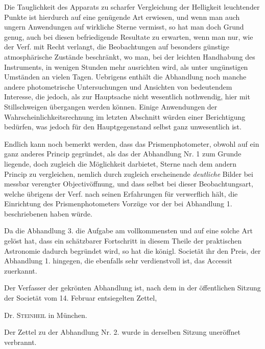 Die Tauglichkeit des Apparats zu scharfer Vergleichung der Helligkeit leuchtender Punkte ist
hierdurch auf eine genügende Art erwiesen, und wenn man auch ungern Anwendungen auf wirkliche
Sterne vermisst, so hat man doch Grund genug, auch bei diesen befriedigende Resultate zu erwarten,
wenn man nur, wie der Verf. mit Recht verlangt, die Beobachtungen auf besonders günstige
atmosphärische Zustände beschränkt, wo man, bei der leichten Handhabung des Instruments, in
wenigen Stunden mehr ausrichten wird, als unter ungünstigen Umständen an vielen Tagen. Uebrigens
enthält die Abhandlung noch manche andere photometrische Untersuchungen und Ansichten von
bedeutendem Interesse, die jedoch, als zur Hauptsache nicht wesentlich nothwendig, hier mit
Stillschweigen übergangen werden können. Einige Anwendungen der Wahrscheinlichkeitsrechnung im
letzten Abschnitt würden einer Berichtigung bedürfen, was jedoch für den Hauptgegenstand selbst
ganz unwesentlich ist.

Endlich kann noch bemerkt werden, dass das Prismenphotometer, obwohl auf ein ganz anderes
Princip gegründet, als das der Abhandlung Nr. 1 zum Grunde liegende, doch zugleich die
Möglichkeit darbietet, Sterne nach dem andern Princip zu vergleichen, nemlich durch zugleich
erscheinende \emph{deutliche} Bilder bei messbar verengter Objectivöffnung, und dass selbst bei
dieser Beobachtungsart, welche übrigens der Verf. nach seinen Erfahrungen für verwerflich hält,
die Einrichtung des Prismenphotometers Vorzüge vor der bei Abhandlung 1. beschriebenen haben
würde.

Da die Abhandlung 3. die Aufgabe am vollkommensten und auf eine solche Art gelöst hat, dass ein
schätzbarer Fortschritt in diesem Theile der praktischen Astronomie dadurch begründet wird, so hat
die königl. Societät ihr den Preis, der Abhandlung 1. hingegen, die ebenfalls sehr verdienstvoll
ist, das Accessit zuerkannt.

Der Verfasser der gekrönten Abhandlung ist, nach dem in der öffentlichen Sitzung der Societät vom
14. Februar entsiegelten Zettel,

\begin{center}
Dr. \textsc{Steinheil} in München.
\end{center}

Der Zettel zu der Abhandlung Nr. 2. wurde in derselben Sitzung uneröffnet verbrannt.
